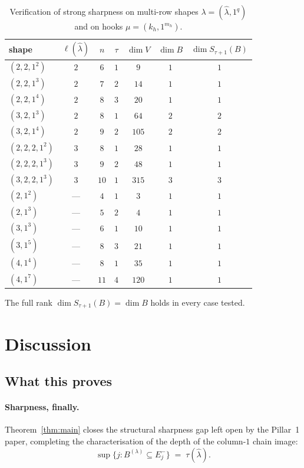 \documentclass[11pt]{article}
\theoremstyle{definition}
\newcommand{\hatl}{\widehat\lambda}
\newcommand{\elh}{\ell(\hatl)}
\begin{document}
\begin{table}[h]
\centering\renewcommand{\arraystretch}{1.2}
\caption{Verification of strong sharpness on multi-row shapes
$\lambda = (\hatl, 1^q)$ and on hooks $\mu = (k_h, 1^{m_h})$.}
\begin{tabular}{lcccccc}
\toprule
shape & $\elh$ & $n$ & $\tau$ & $\dim V$ & $\dim B$ & $\dim S_{\tau+1}(B)$ \\
\midrule
$(2,2,1^2)$ & $2$ & $6$ & $1$ & $9$ & $1$ & $1$ \\
$(2,2,1^3)$ & $2$ & $7$ & $2$ & $14$ & $1$ & $1$ \\
$(2,2,1^4)$ & $2$ & $8$ & $3$ & $20$ & $1$ & $1$ \\
$(3,2,1^3)$ & $2$ & $8$ & $1$ & $64$ & $2$ & $2$ \\
$(3,2,1^4)$ & $2$ & $9$ & $2$ & $105$ & $2$ & $2$ \\
$(2,2,2,1^2)$ & $3$ & $8$ & $1$ & $28$ & $1$ & $1$ \\
$(2,2,2,1^3)$ & $3$ & $9$ & $2$ & $48$ & $1$ & $1$ \\
$(3,2,2,1^3)$ & $3$ & $10$ & $1$ & $315$ & $3$ & $3$ \\
\midrule
$(2,1^2)$ & --- & $4$ & $1$ & $3$ & $1$ & $1$ \\
$(2,1^3)$ & --- & $5$ & $2$ & $4$ & $1$ & $1$ \\
$(3,1^3)$ & --- & $6$ & $1$ & $10$ & $1$ & $1$ \\
$(3,1^5)$ & --- & $8$ & $3$ & $21$ & $1$ & $1$ \\
$(4,1^4)$ & --- & $8$ & $1$ & $35$ & $1$ & $1$ \\
$(4,1^7)$ & --- & $11$ & $4$ & $120$ & $1$ & $1$ \\
\bottomrule
\end{tabular}
\end{table}

The full rank $\dim S_{\tau+1}(B) = \dim B$ holds in every case
tested.

\section{Discussion}\label{sec:discussion}

\subsection{What this proves}

\paragraph{Sharpness, finally.}
Theorem~\ref{thm:main} closes the structural sharpness gap left open
by the Pillar~1 paper, completing the characterisation of the depth
of the column-$1$ chain image:
\[
   \sup\{j : B^{(\lambda)} \subseteq E^-_j\} \;=\; \tau(\hatl).
\]
\end{document}

